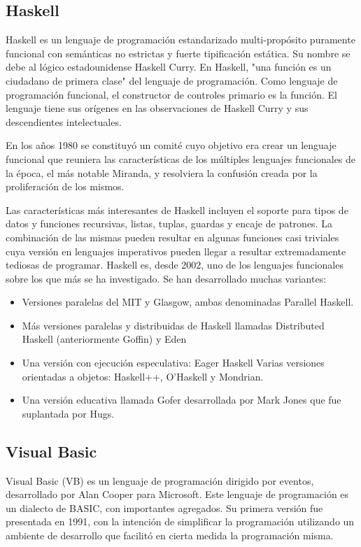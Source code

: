 \documentclass[twoside,twocolumn]{article}
\begin{document}
\subsection{Haskell}

Haskell es un lenguaje de programación estandarizado multi-propósito puramente funcional con semánticas no estrictas y fuerte tipificación estática. Su nombre se debe al lógico estadounidense Haskell Curry. En Haskell, "una función es un ciudadano de primera clase" del lenguaje de programación. Como lenguaje de programación funcional, el constructor de controles primario es la función. El lenguaje tiene sus orígenes en las observaciones de Haskell Curry y sus descendientes intelectuales.

En los años 1980 se constituyó un comité cuyo objetivo era crear un lenguaje funcional que reuniera las características de los múltiples lenguajes funcionales de la época, el más notable Miranda, y resolviera la confusión creada por la proliferación de los mismos.

Las características más interesantes de Haskell incluyen el soporte para tipos de datos y funciones recursivas, listas, tuplas, guardas y encaje de patrones. La combinación de las mismas pueden resultar en algunas funciones casi triviales cuya versión en lenguajes imperativos pueden llegar a resultar extremadamente tediosas de programar. Haskell es, desde 2002, uno de los lenguajes funcionales sobre los que más se ha investigado. Se han desarrollado muchas variantes:
\begin{itemize}

\item Versiones paralelas del MIT y Glasgow, ambas denominadas Parallel Haskell.
\item Más versiones paralelas y distribuidas de Haskell llamadas Distributed Haskell (anteriormente Goffin) y Eden
\item   Una versión con ejecución especulativa: Eager Haskell
    Varias versiones orientadas a objetos: Haskell++, O'Haskell y Mondrian.
\item Una versión educativa llamada Gofer desarrollada por Mark Jones que fue suplantada por Hugs.
    
\end{itemize}

\subsection{Visual Basic}

Visual Basic (VB) es un lenguaje de programación dirigido por eventos, desarrollado por Alan Cooper para Microsoft. Este lenguaje de programación es un dialecto de BASIC, con importantes agregados. Su primera versión fue presentada en 1991, con la intención de simplificar la programación utilizando un ambiente de desarrollo que facilitó en cierta medida la programación misma.
\end{document}
